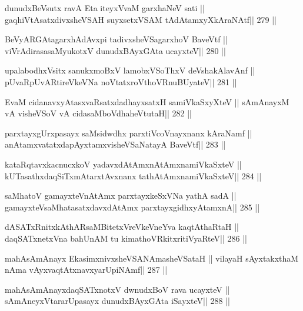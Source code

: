 \begin{shl}
dunudxBeVsutx ravA Eta iteyxVvaM garxhaNeV sati ||
gaqhiVtAsatxdivxsheVSAH suyxsetxVSAM tAdAtamxyXkAraNAtf\hfill || 279 ||
\end{shl}

\begin{shl}
BeVyARGAtagarxhAdAvx\s pi tadivxsheVSagarxhoV BaveVtf ||
viVrAdirasasaMyukotxV dunudxBAyxGAta ucayxteV\hfill || 280 ||
\end{shl}

\begin{shl}
upalabodhxV\s sitx sanukxmoBxV lamobxVSoThxV deVshakAlavAnf ||
pUvaRpUvARtireVkeVNa noVtatxroV\s thoVR\s nuBUyateV\hfill || 281 ||
\end{shl}

\begin{shl}
EvaM cidanavxyAtasxvaRsatxdadhayxsatxH samiVkaSxyXteV ||
sAmAnayxM vA visheVSoV vA cidasaMboVdhaheVtutaH\hfill || 282 ||
\end{shl}

\begin{shl}
parxtayxgUrxpasayx saMsidwdhx parxtiVcoV\s nayxnanx kAraNamf ||
anAtamxvatatxdapAyxtamxvisheVSaNatayA BaveVtf\hfill || 283 ||
\end{shl}

\begin{shl}
kataRqtavxkacnucxkoV yadavxdAtAmx\s nAtAmxnamiVkaSxteV ||
kUTasathxdaqSiTxmAtarxtAvxnanx tathA\s\s tAmxnamiVkaSxteV\hfill || 284 ||
\end{shl}

\begin{shl}
saMhatoV gamayxteV\s nAtAmx parxtayxkeSxVNa yathA sadA ||
gamayxteV\s saMhatasatxdavxdAtAmx parxtayxgidhxyA\s\s tamxnA\hfill || 285 ||
\end{shl}

\begin{shl}
dASATxRnitxkAthARsaMBitetxVreVkeVneYva kaqtAthaRtaH ||
daqSATxnetxVna bahUnAM tu kimathoVRkitxritiVyaRteV\hfill || 286 ||
\end{shl}

\begin{shl}
mahAsAmAnayx EkasimxnivxsheVSANAmasheVSataH ||
vilayaH sAyxtakxthaM nAma vAyxvaqtAtxnavxyarUpiNAmf\hfill || 287 ||
\end{shl}

\begin{shl}
mahAsAmAnayxdaqSATxnotxV dwnudxBoV rava ucayxteV ||
sAmAneyxVtararUpasayx dunudxBAyxGAta iSayxteV\hfill || 288 ||
\end{shl}

